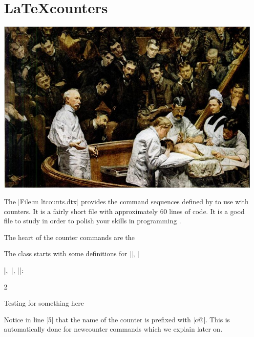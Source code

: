 \chapter{\LaTeX counters}

\thispagestyle{plain}
{\centering\includegraphics[width=\textwidth]{./images/agnewesclinic.png}\par}

{\centering {}\par}


The |File:m ltcounts.dtx| provides the command sequences defined by \latex to use with counters. It is a fairly short file with approximately 
60 lines of code. It is a good file to study in order to polish your skills in programming \tex. 

The heart of the counter commands are the 

The class starts with some definitions for |\setcounter|, |\addtocounter|, |\newcounter|, |\value|:


\begin{teXXX}
2 \def\setcounter#1#2{%
3   \@ifundefined{c@#1}%
4      {\@nocounterr{#1}}%
5      {\global\csname c@#1\endcsname#2\relax}}
\end{teXXX}


Testing for something here

Notice in line [5] that the name of the counter is prefixed with |c@|. This is automatically done for newcounter commands which we explain later on.


